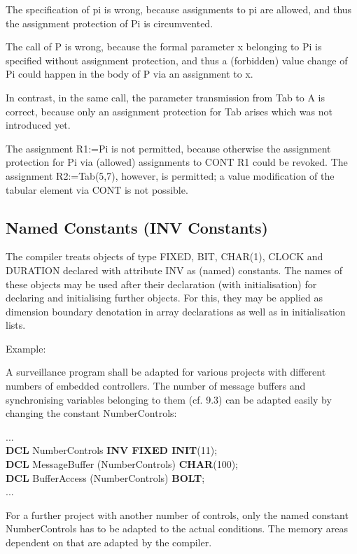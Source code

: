 The specification of pi is wrong, because assignments to pi are allowed,
and thus the assignment protection of Pi is circumvented.

The call of P is wrong, because the formal parameter x belonging to Pi
is specified without assignment protection, and thus a (forbidden) value
change of Pi could happen in the body of P via an assignment to x.

In contrast, in the same call, the parameter transmission from Tab to A
is correct, because only an assignment protection for Tab arises which
was not introduced yet.

The assignment R1:=Pi is not permitted, because otherwise the assignment
protection for Pi via (allowed) assignments to CONT R1 could be revoked.
The assignment R2:=Tab(5,7), however, is permitted; a value modification
of the tabular element via CONT is not possible.

\subsection{Named Constants (INV Constants)}   %
\label{sec_named_const}

The compiler treats objects of type FIXED, BIT, CHAR(1), CLOCK and
DURATION declared with attribute INV as (named) constants. The names of
these objects may be used after their declaration (with initialisation)
for declaring and initialising further objects. For this, they may be
applied as dimension boundary denotation in array declarations as well
as in initialisation lists.

Example:

A surveillance program shall be adapted for various projects with
different numbers of embedded controllers. The number of message
buffers and synchronising variables belonging to them (cf. 9.3) can be
adapted easily by changing the constant NumberControls:

...\\
{\bf DCL} NumberControls {\bf INV FIXED INIT}(11);\\

{\bf DCL} MessageBuffer (NumberControls) {\bf CHAR}(100); \\
{\bf DCL} BufferAccess (NumberControls) {\bf BOLT};\\
...

For a further project with another number of controls, only the named
constant NumberControls has to be adapted to the actual conditions. The
memory areas dependent on that are adapted by the compiler.

